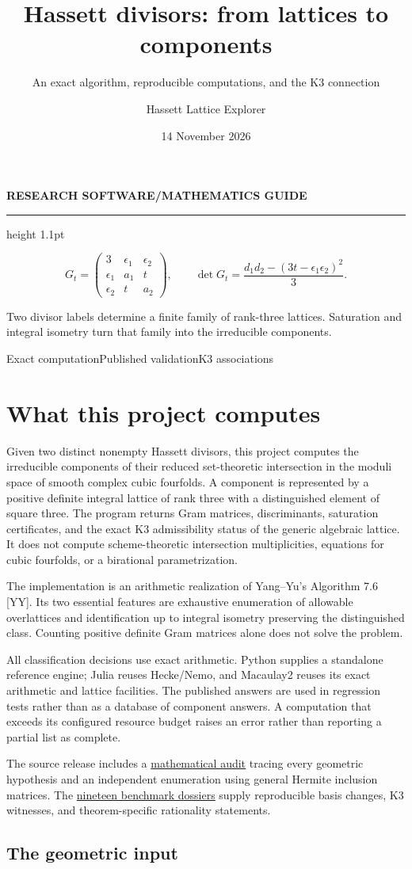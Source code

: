 \documentclass[
  american,
  11pt,
  a4paper,
]{article}
\title{Hassett divisors: from lattices to components}
\subtitle{An exact algorithm, reproducible computations, and the K3
connection}
\author{Hassett Lattice Explorer}
\date{14 November 2026}
\makeatletter
\providecommand{\GuideSubtitle}{}
\renewcommand{\maketitle}{%
  \begin{titlepage}
  \thispagestyle{empty}
  \vspace*{10mm}
  {\sffamily\bfseries\small\color{GuideAccent}RESEARCH SOFTWARE\quad /\quad MATHEMATICS GUIDE\par}
  \vspace{10mm}
  {\sffamily\bfseries\fontsize{32}{37}\selectfont\color{GuideInk}\@title\par}
  \vspace{8mm}
  {\sffamily\large\color{GuideMuted}\GuideSubtitle\par}
  \vspace{16mm}
  {\color{GuideAccent}\hrule height 1.1pt}
  \vspace{12mm}
  {\large
  \[
  G_t=\begin{pmatrix}3&\epsilon_1&\epsilon_2\\
  \epsilon_1&a_1&t\\\epsilon_2&t&a_2\end{pmatrix},
  \qquad
  \det G_t=\frac{d_1d_2-(3t-\epsilon_1\epsilon_2)^2}{3}.
  \]
  }
  \vspace{10mm}
  \begin{minipage}{0.92\textwidth}
  {\large\color{GuideInk}Two divisor labels determine a finite family of rank-three lattices. Saturation and integral isometry turn that family into the irreducible components.\par}
  \vspace{7mm}
  {\sffamily\small\color{GuideMuted}Exact computation\quad\textbullet\quad Published validation\quad\textbullet\quad K3 associations\par}
  \end{minipage}
  \vfill
  {\sffamily\bfseries\color{GuideInk}\@author\par}
  \vspace{2mm}
  {\sffamily\small\color{GuideMuted}\@date\par}
  \end{titlepage}
  \pagenumbering{roman}
}
\makeatother
\begin{document}
\maketitle

{
\setcounter{tocdepth}{2}
\tableofcontents
}
\section{What this project computes}\label{what-this-project-computes}

Given two distinct nonempty Hassett divisors, this project computes the
irreducible components of their reduced set-theoretic intersection in
the moduli space of smooth complex cubic fourfolds. A component is
represented by a positive definite integral lattice of rank three with a
distinguished element of square three. The program returns Gram
matrices, discriminants, saturation certificates, and the exact K3
admissibility status of the generic algebraic lattice. It does not
compute scheme-theoretic intersection multiplicities, equations for
cubic fourfolds, or a birational parametrization.

The implementation is an arithmetic realization of Yang--Yu's Algorithm
7.6 {[}YY{]}. Its two essential features are exhaustive enumeration of
allowable overlattices and identification up to integral isometry
preserving the distinguished class. Counting positive definite Gram
matrices alone does not solve the problem.

All classification decisions use exact arithmetic. Python supplies a
standalone reference engine; Julia reuses Hecke/Nemo, and Macaulay2
reuses its exact arithmetic and lattice facilities. The published
answers are used in regression tests rather than as a database of
component answers. A computation that exceeds its configured resource
budget raises an error rather than reporting a partial list as complete.

The source release includes a \href{math-audit.md}{mathematical audit}
tracing every geometric hypothesis and an independent enumeration using
general Hermite inclusion matrices. The
\href{benchmark-components.md}{nineteen benchmark dossiers} supply
reproducible basis changes, K3 witnesses, and theorem-specific
rationality statements.

\subsection{The geometric input}\label{the-geometric-input}
\end{document}
